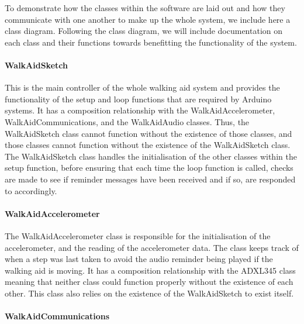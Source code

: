                 To demonstrate how the classes within the software are laid out and how they communicate with one another to make up the whole system, we include here a class diagram. Following the class diagram, we will include documentation on each class and their functions towards benefitting the functionality of the system. 

                \clearpage
                \thispagestyle{empty}
                \begin{landscape}
                    
                \end{landscape}

                \paragraph{WalkAidSketch}\mbox{}

                    This is the main controller of the whole walking aid system and provides the functionality of the setup and loop functions that are required by Arduino systems. It has a composition relationship with the WalkAidAccelerometer, WalkAidCommunications, and the WalkAidAudio classes. Thus, the WalkAidSketch class cannot function without the existence of those classes, and those classes cannot function without the existence of the WalkAidSketch class. The WalkAidSketch class handles the initialisation of the other classes within the setup function, before ensuring that each time the loop function is called, checks are made to see if reminder messages have been received and if so, are responded to accordingly.

                \paragraph{WalkAidAccelerometer}\mbox{}

                    The WalkAidAccelerometer class is responsible for the initialisation of the accelerometer, and the reading of the accelerometer data. The class keeps track of when a step was last taken to avoid the audio reminder being played if the walking aid is moving. It has a composition relationship with the ADXL345 class meaning that neither class could function properly without the existence of each other. This class also relies on the existence of the WalkAidSketch to exist itself.

                \paragraph{WalkAidCommunications}\mbox{}

